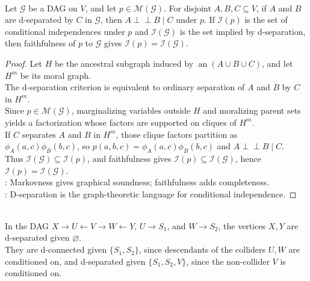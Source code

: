 \begin{theorem} \label{thm:d-separation-conditional-independence-reading} \\
Let $\mathcal{G}$ be a DAG on $V$, and let $p\in\mathcal{M}(\mathcal{G})$.
For disjoint $A,B,C\subseteq V$, if $A$ and $B$ are d-separated by $C$ in $\mathcal{G}$, then $A\perp\!\!\!\perp B\mid C$ under $p$.
If $\mathcal{I}(p)$ is the set of conditional independences under $p$ and $\mathcal{I}(\mathcal{G})$ is the set implied by d-separation, then faithfulness of $p$ to $\mathcal{G}$ gives $\mathcal{I}(p)=\mathcal{I}(\mathcal{G})$.
\begin{proof} Let $H$ be the ancestral subgraph induced by $\operatorname{an}(A\cup B\cup C)$, and let $H^m$ be its moral graph.\\
The d-separation criterion is equivalent to ordinary separation of $A$ and $B$ by $C$ in $H^m$.\\
Since $p\in\mathcal{M}(\mathcal{G})$, marginalizing variables outside $H$ and moralizing parent sets yields a factorization whose factors are supported on cliques of $H^m$.\\
If $C$ separates $A$ and $B$ in $H^m$, those clique factors partition as $\phi_A(a,c)\phi_B(b,c)$, so $p(a,b,c)=\phi_A(a,c)\phi_B(b,c)$ and $A\perp\!\!\!\perp B\mid C$.\\
Thus $\mathcal{I}(\mathcal{G})\subseteq\mathcal{I}(p)$, and faithfulness gives $\mathcal{I}(p)\subseteq\mathcal{I}(\mathcal{G})$, hence $\mathcal{I}(p)=\mathcal{I}(\mathcal{G})$.\\
: Markovness gives graphical soundness; faithfulness adds completeness.\\
: D-separation is the graph-theoretic language for conditional independence.
\end{proof}
\end{theorem}

\begin{example} \label{ex:collider-descendant-d-separation} \\
In the DAG $X\to U\leftarrow V\to W\leftarrow Y$, $U\to S_1$, and $W\to S_2$, the vertices $X,Y$ are d-separated given $\varnothing$.\\
They are d-connected given $\{S_1,S_2\}$, since descendants of the colliders $U,W$ are conditioned on, and d-separated given $\{S_1,S_2,V\}$, since the non-collider $V$ is conditioned on.
\end{example}

